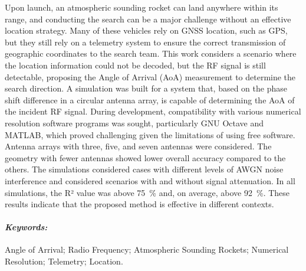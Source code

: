 Upon launch, an atmospheric sounding rocket can land anywhere within its range, and conducting the search can be a major challenge without an effective location strategy.
Many of these vehicles rely on \acs{GNSS} location, such as \acs{GPS}, but they still rely on a telemetry system to ensure the correct transmission of geographic coordinates to the search team.
This work considers a scenario where the location information could not be decoded, but the \acs{RF} signal is still detectable, proposing the Angle of Arrival (\acs{AoA}) measurement to determine the search direction.
A simulation was built for a system that, based on the phase shift difference in a circular antenna array, is capable of determining the \acs{AoA} of the incident \ac{RF} signal.
During development, compatibility with various numerical resolution software programs was sought, particularly GNU Octave and MATLAB, which proved challenging given the limitations of using free software.
Antenna arrays with three, five, and seven antennas were considered. The geometry with fewer antennas showed lower overall accuracy compared to the others.
The simulations considered cases with different levels of \acs{AWGN} noise interference and considered scenarios with and without signal attenuation.
In all simulations, the R² value was above \qty{75}{\percent} and, on average, above \qty{92}{\percent}.
These results indicate that the proposed method is effective in different contexts.

\paragraph*{\textit{Keywords:}} Angle of Arrival; Radio Frequency; Atmospheric Sounding Rockets; Numerical Resolution; Telemetry; Location.
